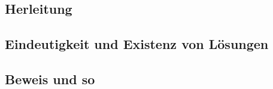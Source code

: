 \subsection{Herleitung} %
\label{sub:herleitung}


\subsection{Eindeutigkeit und Existenz von Lösungen} %
\label{sub:eindeutigkeit_und_existenz_von_l_sungen}



\subsection{Beweis und so} %
\label{sub:beweis_und_so}

